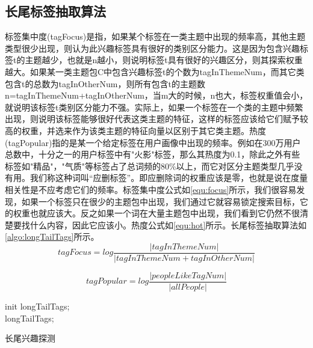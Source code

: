   \subsection{长尾标签抽取算法}
  标签集中度(tagFocus)是指，如果某个标签在一类主题中出现的频率高，其他主题类型很少出现，则认为此兴趣标签具有很好的类别区分能力。这是因为包含兴趣标签t的主题越少，也就是n越小，则说明标签t具有很好的兴趣区分，则其探索权重越大。如果某一类主题包C中包含兴趣标签t的个数为tagInThemeNum，而其它类包含t的总数为tagInOtherNum，则所有包含t的主题数n=tagInThemeNum+tagInOtherNum，当m大的时候，n也大，标签权重值会小，就说明该标签t类别区分能力不强。实际上，如果一个标签在一个类的主题中频繁出现，则说明该标签能够很好代表这类主题的特征，这样的标签应该给它们赋予较高的权重，并选来作为该类主题的特征向量以区别于其它类主题。热度(tagPopular)指的是某一个给定标签在用户画像中出现的频率。例如在300万用户总数中，十分之一的用户标签中有"火影"标签，那么其热度为0.1，除此之外有些标签如"精品"，"气质"等标签占了总词频的80\%以上，而它对区分主题类型几乎没有用。我们称这种词叫“应删标签”。即应删除词的权重应该是零，也就是说在度量相关性是不应考虑它们的频率。标签集中度公式如\autoref{equ:focus}所示，我们很容易发现，如果一个标签只在很少的主题包中出现，我们通过它就容易锁定搜索目标，它的权重也就应该大。反之如果一个词在大量主题包中出现，我们看到它仍然不很清楚要找什么内容，因此它应该小。热度公式如\autoref{equ:hot}所示。长尾标签抽取算法如\autoref{algo:longTailTags}所示。
    \begin{equation}
      tagFocus=log\frac{|tagInThemeNum|}{|tagInThemeNum+tagInOtherNum|}
      \label{equ:focus}
    \end{equation}

    \begin{equation}
      tagPopular=log\frac{|peopleLikeTagNum|}{|allPeople|}
      \label{equ:hot}
    \end{equation}

  \begin{algorithm}
  init longTailTags;\\
  \Return longTailTags;
  \caption{长尾兴趣探测}
  \label{algo:longTailTags}
  \end{algorithm}

